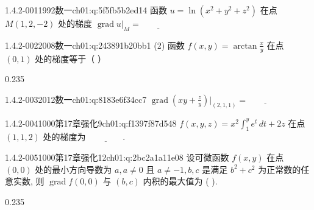 \par\addvspace{2.4ex}\noindent
\begin{minipage}{\linewidth}

\begin{q}{1.4.2-001}{1992数一}{ch01:q:5f5fb5b2ed14}
函数 $u=\ln(x^2+y^2+z^2)$ 在点 $M(1,2,-2)$ 处的梯度 $\left.\operatorname{grad}u\right|_M=\underline{\hspace{4em}}$
\end{q}
\end{minipage}


\begin{q}{1.4.2-002}{2008数一}{ch01:q:243891b20bb1}
(2) 函数 $f(x,y)=\arctan \frac{x}{y}$ 在点 $(0,1)$ 处的梯度等于（ ）
\begin{opts}{0.235}
\hfill{}\hfill{}\hfill{}
\end{opts}
\end{q}

\begin{q}{1.4.2-003}{2012数一}{ch01:q:8183e6f34cc7}
$\displaystyle \operatorname{grad}\left(xy+\frac{z}{y}\right)\bigg|_{(2,1,1)} = \underline{\hspace{4em}}$
\end{q}

\begin{q}{1.4.2-004}{1000第17章强化9}{ch01:q:f1397f87d548}
$\displaystyle f(x,y,z)=x^2\int_1^y e^t\,dt+2z$ 在点 $(1,1,2)$ 处的梯度为 $\underline{\hspace{4em}}$.
\end{q}

\begin{q}{1.4.2-005}{1000第17章强化12}{ch01:q:2bc2a1a11e08}
设可微函数 $f(x,y)$ 在点 $(0,0)$ 处的最小方向导数为 $a, a\neq 0$ 且 $a\neq -1, b,c$ 是满足 $b^2+c^2$ 为正常数的任意实数, 则 $\operatorname{grad} f(0,0)$ 与 $(b,c)$ 内积的最大值为 ( ).
\begin{opts}{0.235}
\hfill{}\hfill{}\hfill{}
\end{opts}
\end{q}

